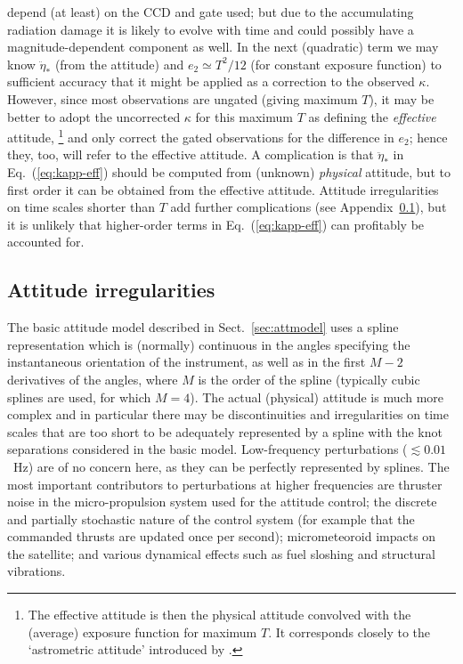 \documentclass[structabstract]{aa}
\begin{document}
depend (at least) on the CCD and gate used; but due to the accumulating radiation
damage it is likely to evolve with time and could possibly have a magnitude-dependent
component as well. In the next (quadratic) term we may know $\ddot{\eta}_*$ (from the
attitude) and $e_2 \simeq T^2/12$ (for constant exposure function) to sufficient 
accuracy that it might be applied as a correction to the observed $\kappa$. However,
since most observations are ungated (giving maximum $T$), it may be better to
adopt the uncorrected $\kappa$ for this maximum $T$ as defining the 
\emph{effective} attitude,%
\footnote{The effective attitude is then the physical attitude convolved 
with the (average) exposure function for maximum $T$. It corresponds closely 
to the `astrometric attitude' introduced by \citet{2005A&A...438..745B}.}
and only correct the gated observations for the difference in $e_2$; hence they, 
too, will refer to the effective attitude. A complication is that $\ddot{\eta}_*$
in Eq.~(\ref{eq:kapp-eff}) should be computed from (unknown) 
\emph{physical} attitude, but to first order it can be obtained from the effective 
attitude. Attitude irregularities on time scales shorter than $T$ add further 
complications (see Appendix~\ref{sec:attirr}), but it is unlikely that higher-order 
terms in Eq.~(\ref{eq:kapp-eff}) can profitably be accounted for.

 
\subsection{Attitude irregularities}\label{sec:attirr} 

The basic attitude model described in Sect.~\ref{sec:attmodel} uses a spline
representation which is (normally) continuous in the angles specifying the
instantaneous orientation of the instrument, as well as in the first $M-2$
derivatives of the angles, where $M$ is the order of the spline (typically
cubic splines are used, for which $M=4$). The actual (physical) attitude
is much more complex and in particular there may be discontinuities and
irregularities on time scales that are too short to be adequately represented
by a spline with the knot separations considered in the basic model.
Low-frequency perturbations ($\lesssim 0.01$~Hz) are of no concern here,
as they can be perfectly represented by splines. The most important contributors 
to perturbations at higher frequencies are thruster noise in the micro-propulsion
system used for the attitude control; the discrete and partially stochastic nature 
of the control system (for example that the commanded thrusts are updated once
per second); micrometeoroid impacts on the satellite; and various dynamical 
effects such as fuel sloshing and structural vibrations.
\end{document}
